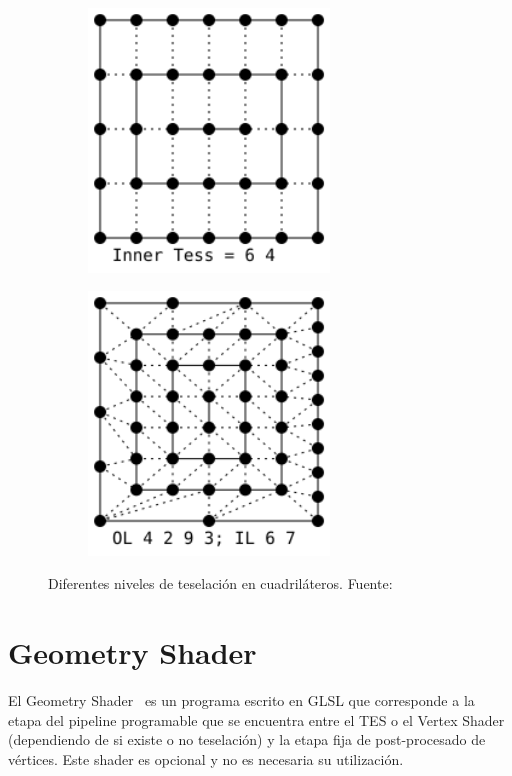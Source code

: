 \begin{figure}
\begin{subfigure}{0.40\textwidth}
	\end{subfigure}
	\hfill
	\begin{subfigure}{0.40\textwidth}
			\includegraphics[height=7cm,width=\textwidth]{figures/QuadInnerOnlyLineCorr.png}	
	\end{subfigure}
	\newline
	\begin{subfigure}{0.40\textwidth}
			\includegraphics[height=7cm,width=\textwidth]{figures/QuadFull.png}	
	\end{subfigure}
	\caption[Diferentes niveles de teselación en cuadriláteros.]{Diferentes
			niveles de teselación en cuadriláteros.
	Fuente:~\cite{TessellationImages}}
	\label{fig:quadtessellation}
\end{figure}

\section{Geometry Shader}
\label{ref:GeoShader}

El Geometry Shader~\cite{GeoShader} es un programa escrito en GLSL que
corresponde a la etapa del pipeline programable que se encuentra entre el TES o
el Vertex Shader (dependiendo de si existe o no teselación) y la etapa fija de
post-procesado de vértices. Este shader es opcional y no es necesaria su
utilización.

